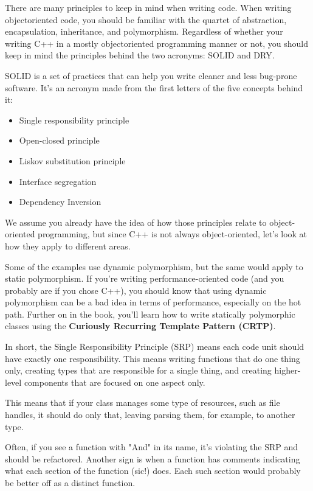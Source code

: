 
There are many principles to keep in mind when writing code. When writing objectoriented code, you should be familiar with the quartet of abstraction, encapsulation, inheritance, and polymorphism. Regardless of whether your writing C++ in a mostly objectoriented programming manner or not, you should keep in mind the principles behind the two acronyms: SOLID and DRY.

SOLID is a set of practices that can help you write cleaner and less bug-prone software. It's an acronym made from the first letters of the five concepts behind it:

\begin{itemize}
\item Single responsibility principle
\item Open-closed principle
\item Liskov substitution principle
\item Interface segregation
\item Dependency Inversion
\end{itemize}

We assume you already have the idea of how those principles relate to object-oriented programming, but since C++ is not always object-oriented, let's look at how they apply to different areas.

Some of the examples use dynamic polymorphism, but the same would apply to static polymorphism. If you're writing performance-oriented code (and you probably are if you chose C++), you should know that using dynamic polymorphism can be a bad idea in terms of performance, especially on the hot path. Further on in the book, you'll learn how to write statically polymorphic classes using the \textbf{Curiously Recurring Template Pattern (CRTP)}.



In short, the Single Responsibility Principle (SRP) means each code unit should have exactly one responsibility. This means writing functions that do one thing only, creating types that are responsible for a single thing, and creating higher-level components that are focused on one aspect only. 

This means that if your class manages some type of resources, such as file handles, it should do only that, leaving parsing them, for example, to another type.

Often, if you see a function with "And" in its name, it's violating the SRP and should be refactored. Another sign is when a function has comments indicating what each section of the function (sic!) does. Each such section would probably be better off as a distinct function.


